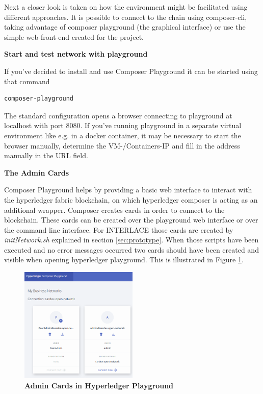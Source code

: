 Next a closer look is taken on how the environment might be facilitated using different approaches. It is possible to connect to the chain using composer-cli, taking advantage of composer playground (the graphical interface) or use the simple web-front-end created for the project.

\textbf{Start and test network with playground}

If you've decided to install and use Composer Playground it can be started using that command

\begin{lstlisting}[language=bash]
	composer-playground
\end{lstlisting}

The standard configuration opens a browser connecting to playground at localhost with port 8080. If you've running playground in a separate virtual environment like e.g. in a docker container, it may be necessary to start the browser manually, determine the VM-/Containers-IP and fill in the address manually in the URL field.

\textbf{The Admin Cards}

Composer Playground helps by providing a basic web interface to interact with the hyperledger fabric blockchain, on which hyperledger composer is acting as an additional wrapper. Composer creates cards in order to connect to the blockchain. These cards can be created over the playground web interface or over the command line interface. For INTERLACE those cards are created by \textit{initNetwork.sh} explained in section \ref{sec:prototype}. When those scripts have been executed and no error messages occurred two cards should have been created and visible when opening hyperledger playground. This is illustrated in Figure \ref{fig:admin-cards}.

\begin{figure}[htbp]
  \centering
  \includegraphics[width=0.5\textwidth]{Figures/admin-cards}
  \caption{\bf\small Admin Cards in Hyperledger Playground}
  \label{fig:admin-cards}
\end{figure}

